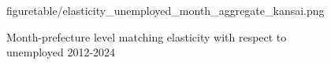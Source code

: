 \documentclass[12pt]{article}
\begin{document}
\begin{figure}[!ht]
\begin{center}
{  {figuretable/elasticity_unemployed_month_aggregate_kansai.png}}
  \\
  \caption{Month-prefecture level matching elasticity with respect to unemployed 2012-2024}
  \label{fg:month_part_and_full_time_elasticity_unemployed_month_aggregate_prefecture_results} 
  \end{center}
  \footnotesize
\end{figure} 
\end{document}

